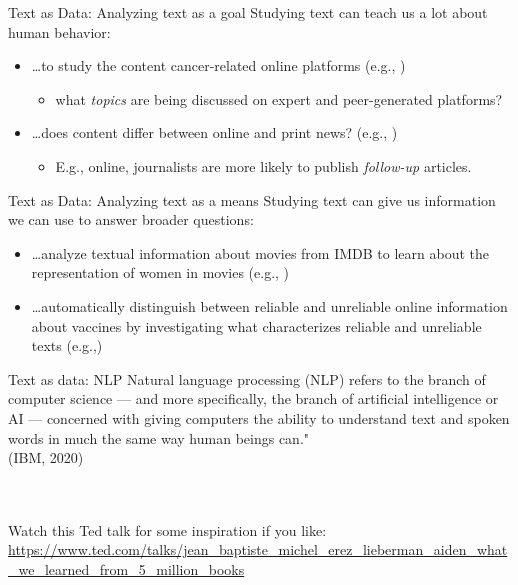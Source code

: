 \documentclass[handout]{beamer}
\begin{document}
\begin{frame}{Text as Data: Analyzing text as a goal}
	Studying text can teach us a lot about human behavior:
	\begin{itemize}[<+->]
	\item \dots to study the content cancer-related online platforms (e.g., \cite{sanders_different_2020})
	\begin{itemize}
	\item what \emph{topics} are being discussed on expert and peer-generated platforms?
	\end{itemize}
	\item \dots does content differ between online and print news? (e.g., \cite{burggraaff_through_2020})
	\begin{itemize}
	\item E.g., online, journalists are more likely to publish \emph{follow-up} articles.
	\end{itemize}
	\end{itemize}
\end{frame}
	
\begin{frame}{Text as Data: Analyzing text as a means}
Studying text can give us information we can use to answer broader questions: 
\begin{itemize}[<+->]
	\item \dots analyze textual information about movies from IMDB to learn about the representation of women in movies (e.g.,\cite{poma-murialdo_gender_2019} )
	\item \dots automatically distinguish between reliable and unreliable online information about vaccines 
	by investigating what characterizes reliable and unreliable texts (e.g.,\cite{meppelink_reliable_2021})
\end{itemize}
\end{frame}

\begin{frame}{Text as data: NLP}
\alert{Natural language processing (NLP)} refers to the branch of computer science — and more specifically, the branch of artificial intelligence or AI — concerned with giving computers the ability to understand text and spoken words in much the same way human beings can."  \\
\tiny{(IBM, 2020)}

\\ \\


Watch this Ted talk for some inspiration if you like: 
\url{https://www.ted.com/talks/jean_baptiste_michel_erez_lieberman_aiden_what_we_learned_from_5_million_books}
\end{frame}
\end{document}
